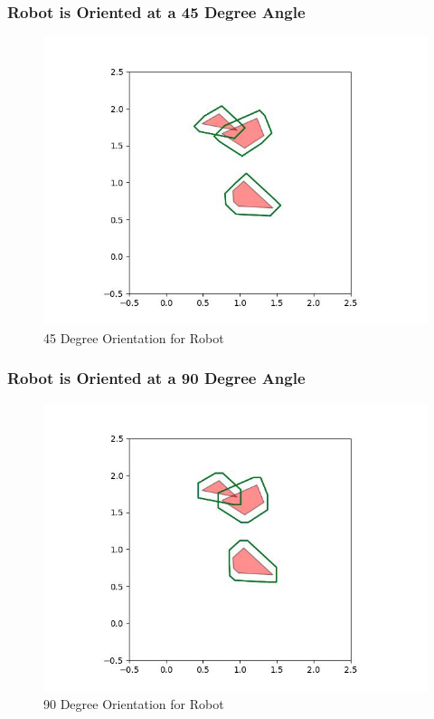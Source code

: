 \documentclass{article}
\begin{document}
\newpage
\subsubsection{Robot is Oriented at a 45 Degree Angle}
\begin{figure}[h!]
	\includegraphics[width= 0.9 \linewidth]{Problem3_minkowski1_45.jpg}
	\centering
	\caption{45 Degree Orientation for Robot}
	\label{Problem3_minkowski1_45.jpg}
\end{figure}

\newpage
\subsubsection{Robot is Oriented at a 90 Degree Angle}
\begin{figure}[h!]
	\includegraphics[width= 0.9 \linewidth]{Problem3_minkowski1_90.jpg}
	\centering
	\caption{90 Degree Orientation for Robot}
	\label{Problem3_minkowski1_90.jpg}
\end{figure}
\end{document}

